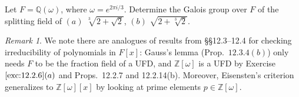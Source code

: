 \documentclass[12pt]{article}
\newtheorem{lemma}{Lemma}[subsubsection]
\theoremstyle{remark}
\newtheorem*{remark}{Remark}
\begin{document}
\begin{problem}
  Let $F = \mathbb{Q}(\omega)$, where $\omega = e^{2\pi i/3}$. Determine the Galois group over $F$ of the splitting field of $(a)$ $\sqrt[3]{2+\sqrt{2}}$, $(b)$ $\sqrt{2+\sqrt[3]{2}}$.
\end{problem}
\begin{remark}
  We note there are analogues of results from \S\S12.3--12.4 for checking irreducibility of polynomials in $F[x]$: Gauss's lemma (Prop.~$12.3.4(b)$) only needs $F$ to be the fraction field of a UFD, and $\mathbb{Z}[\omega]$ is a UFD by Exercise $\ref{exc:12.2.6}(a)$ and Props.~12.2.7 and 12.2.14(b). Moreover, Eisensten's criterion generalizes to $\mathbb{Z}[\omega][x]$ by looking at prime elements $p \in \mathbb{Z}[\omega]$.
\end{remark}
\end{document}
